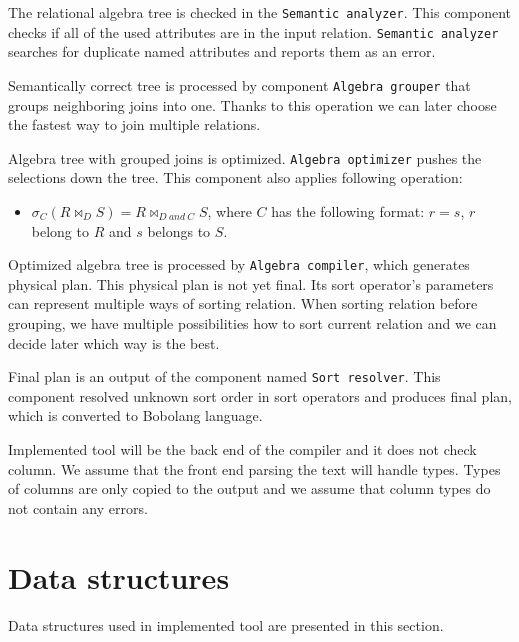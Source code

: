 The relational algebra tree is checked in the \texttt{Semantic analyzer}. This component checks if all of the used attributes are in the input relation. \texttt{Semantic analyzer} searches for duplicate named attributes and reports them as an error. 

Semantically correct tree is processed by component \texttt{Algebra grouper} that groups neighboring joins into one. Thanks to this operation we can later choose the fastest way to join multiple relations.

Algebra tree with grouped joins is optimized. \texttt{Algebra optimizer} pushes the selections down the tree. This component also applies following operation:
\begin{itemize}
\item  $\sigma_C(R\Join_D S)= R\Join_{D~and~C} S$, where $C$ has the following format: $r=s$, $r$ belong to $R$ and $s$ belongs to $S$.
\end{itemize}

Optimized algebra tree is processed by \texttt{Algebra compiler}, which generates physical plan. This physical plan is not yet final. Its sort operator's parameters can represent multiple ways of sorting relation. When sorting relation before grouping, we have multiple possibilities how to sort current relation and we can decide later which way is the best.

Final plan is an output of the component named \texttt{Sort resolver}. This component resolved unknown sort order in sort operators and produces final plan, which is converted to Bobolang language.

Implemented tool  will be the back end of the compiler and it does not check column. We assume that the front end parsing the text will handle types. Types of columns are only copied to the output and we assume that column types do not contain any errors.

\section{Data structures}

Data structures used in implemented tool are presented in this section.

